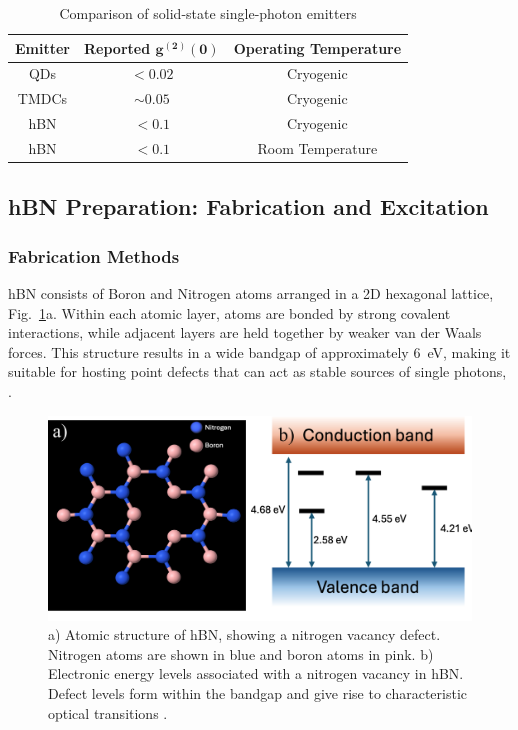 \begin{table}[h]
\centering
\begin{tabular}{|c|c|c|}
\hline
\textbf{Emitter} & \textbf{Reported $\mathbf{g^{(2)}(0)}$} & \textbf{Operating Temperature} \\
\hline
QDs & $<0.02$ \cite{Hanschke2018, Heiss2013} & Cryogenic  \\
\hline
TMDCs & $\sim0.05 $ \cite{Parto2021, Piccinini2025} & Cryogenic  \\
\hline
hBN & $<0.1$ \cite{Vogl2021, Xu2018}  & Cryogenic \\
\hline
hBN & $<0.1$ \cite{Zeng2022, Grosso2017, Vogl2017} & Room Temperature \\
\hline
\end{tabular}
\caption{Comparison of solid-state single-photon emitters}
\label{tab:emitter-comparison}
\end{table}


\subsection{\label{sec:source_prep}hBN Preparation: Fabrication and Excitation}

\subsubsection{Fabrication Methods}

hBN consists of Boron and Nitrogen atoms arranged in a 2D hexagonal lattice, Fig.~\ref{fig:struc}a. Within each atomic layer, atoms are bonded by strong covalent interactions, while adjacent layers are held together by weaker van der Waals forces. This structure results in a wide bandgap of approximately 6~eV, making it suitable for hosting point defects that can act as stable sources of single photons, \cite{Tran2016, Cholsuk2024}.

\begin{figure}[h]
    \centering
    \includegraphics[width=0.9\linewidth]{Figures/hBNStructure.png}
    \caption{a) Atomic structure of hBN, showing a nitrogen vacancy defect. Nitrogen atoms are shown in blue and boron atoms in pink. b) Electronic energy levels associated with a nitrogen vacancy in hBN. Defect levels form within the bandgap and give rise to characteristic optical transitions \cite{Tran2016}.}
    \label{fig:struc}
\end{figure}


